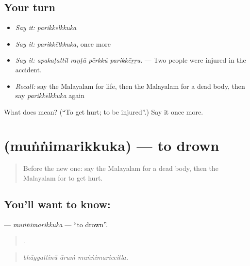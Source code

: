 \subsection*{Your turn}
\begin{itemize}
\raggedright
  \item \emph{Say it:} \emph{parikkēlkkuka}
  \item \emph{Say it:} \emph{parikkēlkkuka}, once more
  \item \emph{Say it:} \emph{apakaṭattil raṇṭŭ pērkkŭ parikkēṟṟu.} — Two people were injured in the accident.
  \item \emph{Recall:} say the Malayalam for life, then the Malayalam for a dead body, then say \emph{parikkēlkkuka} again
\end{itemize}

\begin{tcolorbox}[breakable,colback=teal!4,colframe=teal!35!black,title={Before you move on}]
What does  mean? (\textquotedblleft{}To get hurt; to be injured\textquotedblright{}.) Say it once more.
\end{tcolorbox}
\section[\texorpdfstring{\ml{മുങ്ങിമരിക്കുക} (muṅṅimarikkuka)}{മുങ്ങിമരിക്കുക (muṅṅimarikkuka)}]{ (muṅṅimarikkuka) — to drown}

\label{lesson:ML-C376-munnimarikkuka}



\begin{quote}
Before the new one: say the Malayalam for a dead body, then the Malayalam for to get hurt.
\end{quote}

\subsection*{You'll want to know: }
\textbf{} — \emph{muṅṅimarikkuka} — \textquotedblleft{}to drown\textquotedblright{}.

\begin{quote}
  .
\end{quote}

\begin{quote}
\emph{bhāgyattinŭ āruṁ muṅṅimariccilla.}
\end{quote}

